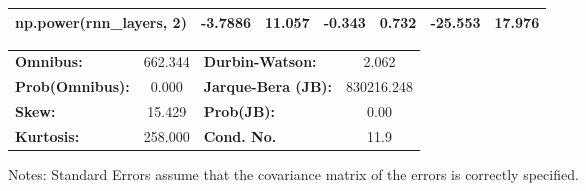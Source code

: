 \begin{center}
\begin{tabular}{lcccccc}
\textbf{np.power(rnn\_layers, 2)}         &      -3.7886  &       11.057     &    -0.343  &         0.732        &      -25.553    &       17.976     \\
\bottomrule
\end{tabular}
\begin{tabular}{lclc}
\textbf{Omnibus:}       & 662.344 & \textbf{  Durbin-Watson:     } &     2.062   \\
\textbf{Prob(Omnibus):} &   0.000 & \textbf{  Jarque-Bera (JB):  } & 830216.248  \\
\textbf{Skew:}          &  15.429 & \textbf{  Prob(JB):          } &      0.00   \\
\textbf{Kurtosis:}      & 258.000 & \textbf{  Cond. No.          } &      11.9   \\
\bottomrule
\end{tabular}
\end{center}

Notes: \newline
 [1] Standard Errors assume that the covariance matrix of the errors is correctly specified.
